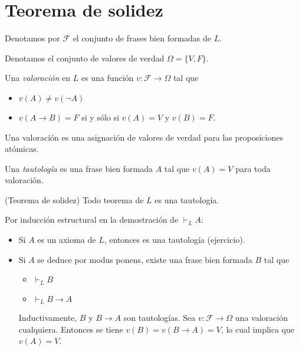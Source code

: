 \chapter{Teorema de solidez}

\begin{notation}
Denotamos por $\mathscr F$ el conjunto de frases bien formadas de $L$.
\end{notation}

\begin{notation}
Denotamos el conjunto de valores de verdad $\Omega = \{ V, F \}$.
\end{notation}

\begin{definition}
Una \textit{valoración} en $L$ es una función $v : \mathscr F \to \Omega$ tal que
\begin{itemize}
    \item $v(A) \ne v(\neg A)$
    \item $v(A \to B) = F$ si y sólo si $v(A) = V$ y $v(B) = F$.
\end{itemize}
\end{definition}

\begin{remark}
Una valoración es una asignación de valores de verdad para las proposiciones atómicas.
\end{remark}

\begin{definition}
Una \textit{tautología} es una frase bien formada $A$ tal que $v(A) = V$ para toda valoración.
\end{definition}

\begin{proposition}
(Teorema de solidez) Todo teorema de $L$ es una tautología.
\end{proposition}

\begin{prove}
Por inducción estructural en la demostración de $\vdash_L A$:

\begin{itemize}
    \item Si $A$ es un axioma de $L$, entonces es una tautología (ejercicio).
    
    \item Si $A$ se deduce por modus ponens, existe una frase bien formada $B$ tal que
    \begin{itemize}
        \item $\vdash_L B$
        \item $\vdash_L B \to A$
    \end{itemize}
    
    Inductivamente, $B$ y $B \to A$ son tautologías. Sea $v : \mathscr F \to \Omega$ una valoración cualquiera. Entonces se tiene $v(B) = v(B \to A) = V$, lo cual implica que $v(A) = V$.
\end{itemize}
\end{prove}

